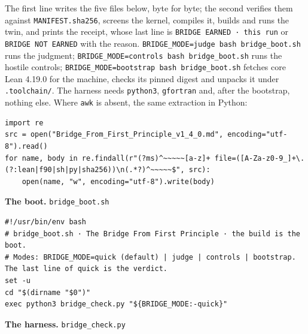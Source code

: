 \documentclass[10pt,twocolumn]{article}
\begin{document}
The first line writes the five files below, byte for byte; the second
verifies them against \texttt{MANIFEST.sha256}, screens the kernel,
compiles it, builds and runs the twin, and prints the receipt, whose
last line is \texttt{BRIDGE\ EARNED\ ·\ this\ run} or
\texttt{BRIDGE\ NOT\ EARNED} with the reason.
\texttt{BRIDGE\_\allowbreak{}MODE=judge\ bash\ bridge\_\allowbreak{}boot.sh} runs the judgment;
\texttt{BRIDGE\_\allowbreak{}MODE=controls\ bash\ bridge\_\allowbreak{}boot.sh} runs the hostile
controls; \texttt{BRIDGE\_\allowbreak{}MODE=bootstrap\ bash\ bridge\_\allowbreak{}boot.sh} fetches
core Lean 4.19.0 for the machine, checks its pinned digest and unpacks
it under \texttt{.toolchain/}. The harness needs \texttt{python3},
\texttt{gfortran} and, after the bootstrap, nothing else. Where
\texttt{awk} is absent, the same extraction in Python:

\begin{Verbatim}
import re
src = open("Bridge_From_First_Principle_v1_4_0.md", encoding="utf-8").read()
for name, body in re.findall(r"(?ms)^~~~~~[a-z]+ file=([A-Za-z0-9_]+\.(?:lean|f90|sh|py|sha256))\n(.*?)^~~~~~$", src):
    open(name, "w", encoding="utf-8").write(body)
\end{Verbatim}

\textbf{The boot.} \texttt{bridge\_\allowbreak{}boot.sh}

\begin{Verbatim}
#!/usr/bin/env bash
# bridge_boot.sh · The Bridge From First Principle · the build is the boot.
# Modes: BRIDGE_MODE=quick (default) | judge | controls | bootstrap. The last line of quick is the verdict.
set -u
cd "$(dirname "$0")"
exec python3 bridge_check.py "${BRIDGE_MODE:-quick}"
\end{Verbatim}

\textbf{The harness.} \texttt{bridge\_\allowbreak{}check.py}
\end{document}
